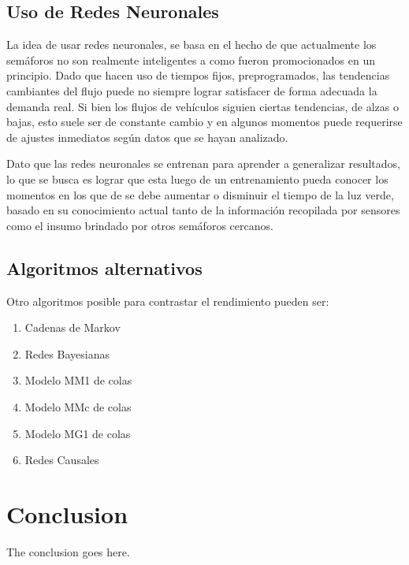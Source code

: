 \documentclass[12pt,journal,compsoc]{IEEEtran}
\begin{document}
\subsection{Uso de Redes Neuronales}
La idea de usar redes neuronales, se basa en el hecho de que actualmente los sem\'{a}foros no son realmente inteligentes a como fueron promocionados en un principio. Dado que hacen uso de tiempos fijos, preprogramados, las tendencias cambiantes del flujo puede no siempre lograr satisfacer de forma adecuada la demanda real. Si bien los flujos de veh\'{i}culos siguien ciertas tendencias, de alzas o bajas, esto suele ser de constante cambio y en algunos momentos puede requerirse de ajustes inmediatos seg\'{u}n datos que se hayan analizado.

Dato que las redes neuronales se entrenan para aprender a generalizar resultados, lo que se busca es lograr que esta luego de un entrenamiento pueda conocer los momentos en los que de se debe aumentar o disminuir el tiempo de la luz verde, basado en su conocimiento actual tanto de la informaci\'{o}n recopilada por sensores como el insumo brindado por otros sem\'{a}foros cercanos.

\subsection{Algoritmos alternativos}
Otro algoritmos posible para contrastar el rendimiento pueden ser:
\begin{enumerate}
\item Cadenas de Markov
\item Redes Bayesianas
\item Modelo MM1 de colas
\item Modelo MMc de colas
\item Modelo MG1 de colas
\item Redes Causales
\end{enumerate}
		
\section{Conclusion}
The conclusion goes here.





\end{document}
